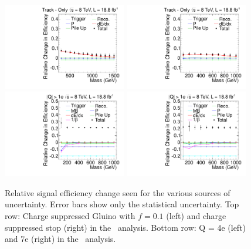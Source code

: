 \begin{figure}[ht]
\centering
  \includegraphics[clip=false, trim=0.0cm 0cm 0.0cm 0cm, width=0.48\textwidth]{figures/tkonly/TkGluinoN_f10Uncertainty}
  \includegraphics[clip=false, trim=0.0cm 0cm 0.0cm 0cm, width=0.48\textwidth]{figures/tkonly/TkStopNUncertainty}\\
  \includegraphics[clip=false, trim=0.0cm 0cm 0.0cm 0cm, width=0.48\textwidth]{figures/multi/HQDY_Q4Uncertainty}
  \includegraphics[clip=false, trim=0.0cm 0cm 0.0cm 0cm, width=0.48\textwidth]{figures/multi/HQDY_Q7Uncertainty}\\
\caption[Relative signal efficiency change seen for the various sources of uncertainty for some of the models considered in the \tkonly\ and \tktof\ analyses]
{Relative signal efficiency change seen for the various sources of uncertainty.
Error bars show only the statistical uncertainty.
Top row: Charge suppressed Gluino with $f=0.1$ (left) and charge suppressed stop (right) in the \tkonly\ analysis.
Bottom row: Q = 4e (left) and 7e (right) in the \multi\ analysis.}
    \label{fig:TkOnMCUncSource}
\end{figure}


